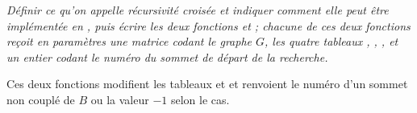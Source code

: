 \newpage
\begin{Exercise}\it
Définir ce qu'on appelle récursivité croisée et indiquer comment elle peut être implémentée en , puis écrire les deux fonctions  et  ; chacune de ces deux fonctions reçoit en paramètres une matrice  codant le graphe $G$, les quatre tableaux , , ,  et un entier codant le numéro du sommet de départ de la recherche.

Ces deux fonctions modifient les tableaux  et  et renvoient le numéro d'un sommet non couplé de $B$ ou la valeur $-1$ selon le cas.
\end{Exercise}

